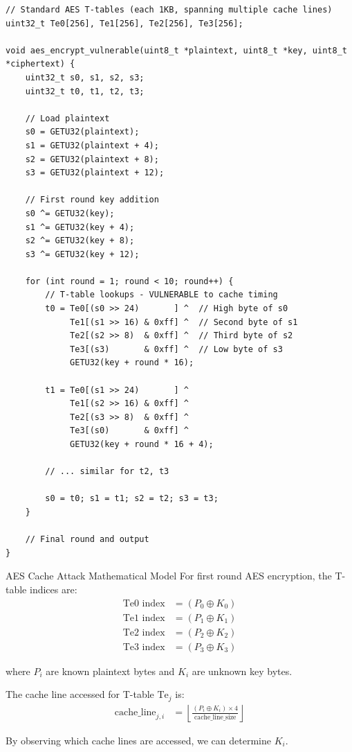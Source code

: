 \documentclass[11pt,a4paper]{article}
\theoremstyle{definition}
\begin{document}
\begin{lstlisting}[caption={AES T-Table Implementation (Vulnerable)}]
// Standard AES T-tables (each 1KB, spanning multiple cache lines)
uint32_t Te0[256], Te1[256], Te2[256], Te3[256];

void aes_encrypt_vulnerable(uint8_t *plaintext, uint8_t *key, uint8_t *ciphertext) {
    uint32_t s0, s1, s2, s3;
    uint32_t t0, t1, t2, t3;
    
    // Load plaintext
    s0 = GETU32(plaintext);
    s1 = GETU32(plaintext + 4);  
    s2 = GETU32(plaintext + 8);
    s3 = GETU32(plaintext + 12);
    
    // First round key addition
    s0 ^= GETU32(key);
    s1 ^= GETU32(key + 4);
    s2 ^= GETU32(key + 8); 
    s3 ^= GETU32(key + 12);
    
    for (int round = 1; round < 10; round++) {
        // T-table lookups - VULNERABLE to cache timing
        t0 = Te0[(s0 >> 24)       ] ^  // High byte of s0
             Te1[(s1 >> 16) & 0xff] ^  // Second byte of s1  
             Te2[(s2 >> 8)  & 0xff] ^  // Third byte of s2
             Te3[(s3)       & 0xff] ^  // Low byte of s3
             GETU32(key + round * 16);
             
        t1 = Te0[(s1 >> 24)       ] ^
             Te1[(s2 >> 16) & 0xff] ^
             Te2[(s3 >> 8)  & 0xff] ^
             Te3[(s0)       & 0xff] ^
             GETU32(key + round * 16 + 4);
             
        // ... similar for t2, t3
        
        s0 = t0; s1 = t1; s2 = t2; s3 = t3;
    }
    
    // Final round and output
}
\end{lstlisting}

\begin{mathematicsbox}{AES Cache Attack Mathematical Model}
For first round AES encryption, the T-table indices are:
\begin{align}
\text{Te0 index} &= (P_0 \oplus K_0) \\
\text{Te1 index} &= (P_1 \oplus K_1) \\
\text{Te2 index} &= (P_2 \oplus K_2) \\
\text{Te3 index} &= (P_3 \oplus K_3)
\end{align}

where $P_i$ are known plaintext bytes and $K_i$ are unknown key bytes.

The cache line accessed for T-table $\text{Te}_j$ is:
\begin{align}
\text{cache\_line}_{j,i} &= \left\lfloor \frac{(P_i \oplus K_i) \times 4}{\text{cache\_line\_size}} \right\rfloor
\end{align}

By observing which cache lines are accessed, we can determine $K_i$.
\end{mathematicsbox}
\end{document}
